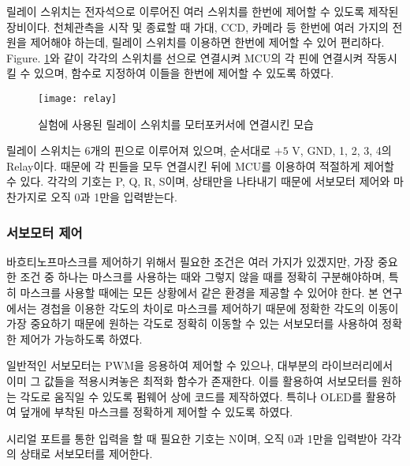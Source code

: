 릴레이 스위치는 전자석으로 이루어진 여러 스위치를 한번에 제어할 수 있도록 제작된 장비이다. 천체관측을 시작 및 종료할 때 가대, CCD, 카메라 등 한번에 여러 가지의 전원을 제어해야 하는데, 릴레이 스위치를 이용하면 한번에 제어할 수 있어 편리하다. \textrm{Figure}. \ref{relay}와 같이 각각의 스위치를 선으로 연결시켜 MCU의 각 핀에 연결시켜 작동시킬 수 있으며, 함수로 지정하여 이들을 한번에 제어할 수 있도록 하였다.


\begin{figure}[h]
	\begin{center}
		\texttt{[image: relay]}
	\end{center}
	\caption{실험에 사용된 릴레이 스위치를 모터포커서에 연결시킨 모습}
	\label{relay}
\end{figure}


릴레이 스위치는 6개의 핀으로 이루어져 있으며, 순서대로 $+5 \textrm{ V}$, GND, 1, 2, 3, 4의 Relay이다. 때문에 각 핀들을 모두 연결시킨 뒤에 MCU를 이용하여 적절하게 제어할 수 있다. 각각의 기호는 P, Q, R, S이며, 상태만을 나타내기 때문에 서보모터 제어와 마찬가지로 오직 0과 1만을 입력받는다.



\subsubsection{서보모터 제어}
바흐티노프마스크를 제어하기 위해서 필요한 조건은 여러 가지가 있겠지만, 가장 중요한 조건 중 하나는 마스크를 사용하는 때와 그렇지 않을 때를 정확히 구분해야하며, 특히 마스크를 사용할 때에는 모든 상황에서 같은 환경을 제공할 수 있어야 한다. 본 연구에서는 경첩을 이용한 각도의 차이로 마스크를 제어하기 때문에 정확한 각도의 이동이 가장 중요하기 때문에 원하는 각도로 정확히 이동할 수 있는 서보모터를 사용하여 정확한 제어가 가능하도록 하였다.

일반적인 서보모터는 PWM을 응용하여 제어할 수 있으나, 대부분의 라이브러리에서 이미 그 값들을 적용시켜놓은 최적화 함수가 존재한다. 이를 활용하여 서보모터를 원하는 각도로 움직일 수 있도록 펌웨어 상에 코드를 제작하였다. 특히나 OLED를 활용하여 덮개에 부착된 마스크를 정확하게 제어할 수 있도록 하였다.

시리얼 포트를 통한 입력을 할 때 필요한 기호는 N이며, 오직 0과 1만을 입력받아 각각의 상태로 서보모터를 제어한다.



